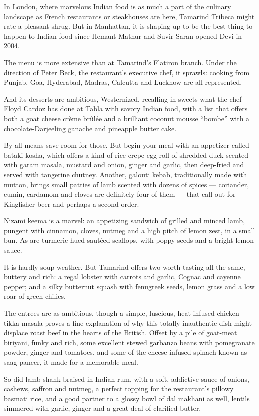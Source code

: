 In London, where marvelous Indian food is as much a part of the culinary
landscape as French restaurants or steakhouses are here, Tamarind
Tribeca might rate a pleasant shrug. But in Manhattan, it is shaping up
to be the best thing to happen to Indian food since Hemant Mathur and
Suvir Saran opened Devi in 2004.

The menu is more extensive than at Tamarind's Flatiron branch. Under the
direction of Peter Beck, the restaurant's executive chef, it sprawls:
cooking from Punjab, Goa, Hyderabad, Madras, Calcutta and Lucknow are
all represented.

And its desserts are ambitious, Westernized, recalling in sweets what
the chef Floyd Cardoz has done at Tabla with savory Indian food, with a
list that offers both a goat cheese crème brûlée and a brilliant coconut
mousse ``bombe'' with a chocolate-Darjeeling ganache and pineapple
butter cake.

By all means save room for those. But begin your meal with an appetizer
called bataki kosha, which offers a kind of rice-crepe egg roll of
shredded duck scented with garam masala, mustard and onion, ginger and
garlic, then deep-fried and served with tangerine chutney. Another,
galouti kebab, traditionally made with mutton, brings small patties of
lamb scented with dozens of spices --- coriander, cumin, cardamom and
cloves are definitely four of them --- that call out for Kingfisher beer
and perhaps a second order.

Nizami keema is a marvel: an appetizing sandwich of grilled and minced
lamb, pungent with cinnamon, cloves, nutmeg and a high pitch of lemon
zest, in a small bun. As are turmeric-hued sautéed scallops, with poppy
seeds and a bright lemon sauce.

It is hardly soup weather. But Tamarind offers two worth tasting all the
same, buttery and rich: a regal lobster with carrots and garlic, Cognac
and cayenne pepper; and a silky butternut squash with fenugreek seeds,
lemon grass and a low roar of green chilies.

The entrees are as ambitious, though a simple, luscious, heat-infused
chicken tikka masala proves a fine explanation of why this totally
inauthentic dish might displace roast beef in the hearts of the British.
Offset by a pile of goat-meat biriyani, funky and rich, some excellent
stewed garbanzo beans with pomegranate powder, ginger and tomatoes, and
some of the cheese-infused spinach known as saag paneer, it made for a
memorable meal.

So did lamb shank braised in Indian rum, with a soft, addictive sauce of
onions, cashews, saffron and nutmeg, a perfect topping for the
restaurant's pillowy basmati rice, and a good partner to a glossy bowl
of dal makhani as well, lentils simmered with garlic, ginger and a great
deal of clarified butter.

